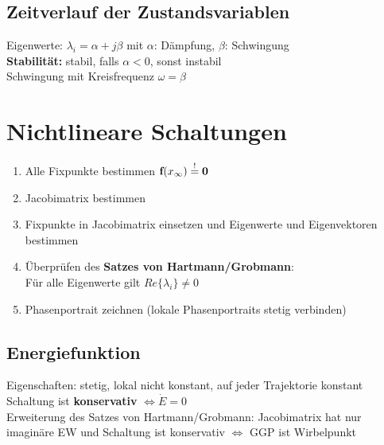 \documentclass[fs, footer]{latex4ei}
\begin{document}
\begin{multicols*}{4}
		\subsection{Zeitverlauf der Zustandsvariablen}
		Eigenwerte: $\lambda_i = \alpha + j\beta$ mit $\alpha$: Dämpfung, $\beta$: Schwingung\\
		\textbf{Stabilität:} stabil, falls $\alpha < 0$, sonst instabil\\
		Schwingung mit Kreisfrequenz $\omega = \beta$\\
\section{Nichtlineare Schaltungen}
	\begin{enumerate}
		\item Alle Fixpunkte bestimmen $\textbf{f}(x_\infty) \stackrel{!}{=} \textbf{0}$
		\item Jacobimatrix bestimmen
		\item Fixpunkte in Jacobimatrix einsetzen und Eigenwerte und Eigenvektoren bestimmen
		\item Überprüfen des \textbf{Satzes von Hartmann/Grobmann}: \\Für alle Eigenwerte gilt $Re\{\lambda_i\} \neq 0$
		\item Phasenportrait zeichnen (lokale Phasenportraits stetig verbinden)
	\end{enumerate}
\subsection{Energiefunktion}
Eigenschaften: stetig, lokal nicht konstant, auf jeder Trajektorie konstant\\
Schaltung ist \textbf{konservativ} $\Leftrightarrow \dot E = 0$\\
Erweiterung des Satzes von Hartmann/Grobmann: Jacobimatrix hat nur imaginäre EW und Schaltung ist konservativ $\Leftrightarrow$ GGP ist Wirbelpunkt\\

\end{multicols*}
\end{document}
